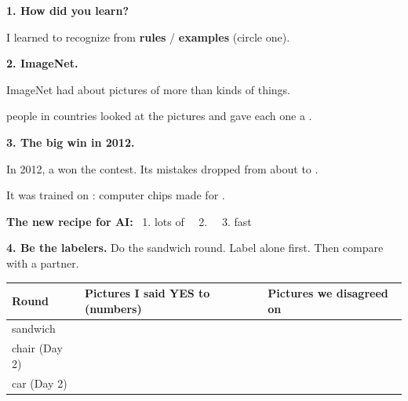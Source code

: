 \documentclass[11pt]{article}
\begin{document}
\partner


\vspace{0.5em}
{\large\textbf{1. How did you learn?}}

\vspace{0.4em}
I learned to recognize  from \quad \textbf{rules} \quad / \quad \textbf{examples} \quad (circle one).

\vspace{1.1em}
{\large\textbf{2. ImageNet.}}

\begin{center}\end{center}

ImageNet had about  pictures of more than  kinds of things.

\vspace{0.9em}
 people in  countries looked at the pictures and gave each one a .

\vspace{1.1em}
{\large\textbf{3. The big win in 2012.}}

\begin{center}\end{center}

In 2012, a  won the contest. Its mistakes dropped from about  to .

\vspace{0.9em}
It was trained on : computer chips made for .

\vspace{0.9em}
\textbf{The new recipe for AI:} \ 1. lots of  \ \ 2.  \ \ 3. fast 

\newpage

{\large\textbf{4. Be the labelers.}} Do the sandwich round. Label alone first. Then compare with a partner.

\vspace{0.3em}
\begin{tabular}{|R{0.95in}|R{2.7in}|R{2.5in}|}
\hline
\textbf{Round} & \textbf{Pictures I said YES to} (numbers) & \textbf{Pictures we disagreed on} \\ \hline
sandwich &  & \\[0.6em] \hline
chair \small(Day 2) & & \\[0.6em] \hline
car \small(Day 2) & & \\[0.6em] \hline
\end{tabular}
\end{document}
